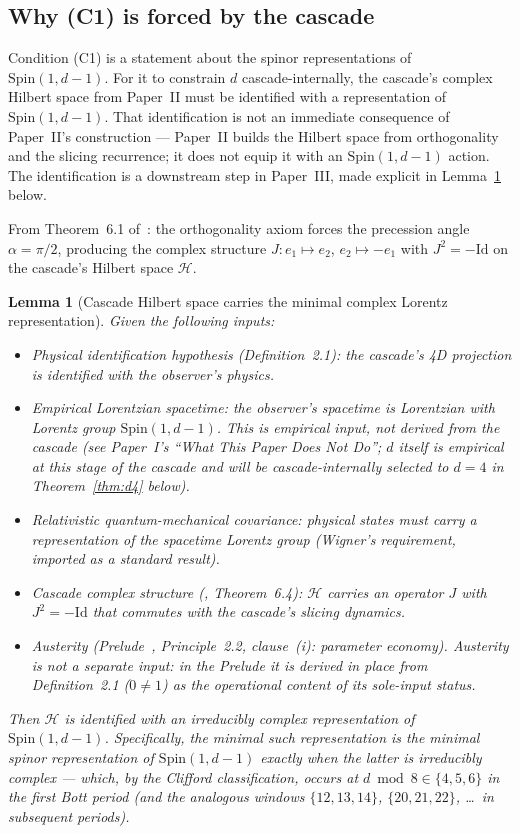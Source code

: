 \documentclass[12pt,a4paper]{article}
\newtheorem{lemma}[theorem]{Lemma}
\begin{document}
\subsection{Why (C1) is forced by the cascade}

Condition (C1) is a statement about the spinor representations of
$\mathrm{Spin}(1,d-1)$. For it to constrain $d$ cascade-internally, the
cascade's complex Hilbert space from Paper~II must be identified with a
representation of $\mathrm{Spin}(1,d-1)$. That identification is not
an immediate consequence of Paper~II's construction --- Paper~II builds
the Hilbert space from orthogonality and the slicing recurrence; it does
not equip it with an $\mathrm{Spin}(1,d-1)$ action. The identification
is a downstream step in Paper~III, made explicit in
Lemma~\ref{lem:cascade-spinor-id} below.

From Theorem~6.1 of~\cite{part2}: the orthogonality axiom forces the
precession angle $\alpha = \pi/2$, producing the complex structure
$J: e_1 \mapsto e_2$, $e_2 \mapsto -e_1$ with $J^2 = -\text{Id}$ on the
cascade's Hilbert space $\mathcal{H}$.

\begin{lemma}[Cascade Hilbert space carries the minimal complex Lorentz representation]\label{lem:cascade-spinor-id}
Given the following inputs:
\begin{itemize}
\item[(i)] \emph{Physical identification hypothesis} (Definition~2.1):
the cascade's 4D projection is identified with the observer's physics.
\item[(ii)] \emph{Empirical Lorentzian spacetime}: the observer's
spacetime is Lorentzian with Lorentz group $\mathrm{Spin}(1,d-1)$. This
is empirical input, not derived from the cascade (see Paper~I's ``What
This Paper Does Not Do''; $d$ itself is empirical at this stage of the
cascade and will be cascade-internally selected to $d=4$ in
Theorem~\ref{thm:d4} below).
\item[(iii)] \emph{Relativistic quantum-mechanical covariance}:
physical states must carry a representation of the spacetime Lorentz
group (Wigner's requirement, imported as a standard result).
\item[(iv)] \emph{Cascade complex structure} (\cite{part2},
Theorem~6.4): $\mathcal{H}$ carries an operator $J$ with
$J^2 = -\mathrm{Id}$ that commutes with the cascade's slicing dynamics.
\item[(v)] \emph{Austerity} (Prelude~\cite{prelude},
Principle~2.2, clause~(i): parameter economy). Austerity is not a
separate input: in the Prelude it is derived in place from
Definition~2.1 ($0\neq 1$) as the operational content of its
sole-input status.
\end{itemize}
Then $\mathcal{H}$ is identified with an \emph{irreducibly complex}
representation of $\mathrm{Spin}(1,d-1)$. Specifically, the minimal
such representation is the minimal spinor representation of
$\mathrm{Spin}(1,d-1)$ exactly when the latter is irreducibly complex
--- which, by the Clifford classification, occurs at
$d\bmod 8 \in \{4,5,6\}$ in the first Bott period (and the analogous
windows $\{12,13,14\}$, $\{20,21,22\}$, \ldots\ in subsequent periods).
\end{lemma}
\end{document}
